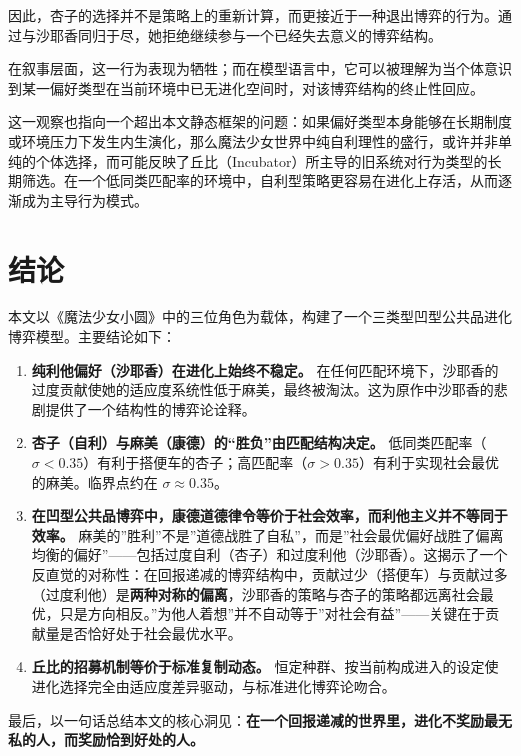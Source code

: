 \documentclass[12pt]{article}
\begin{document}
因此，杏子的选择并不是策略上的重新计算，而更接近于一种退出博弈的行为。通过与沙耶香同归于尽，她拒绝继续参与一个已经失去意义的博弈结构。

在叙事层面，这一行为表现为牺牲；而在模型语言中，它可以被理解为当个体意识到某一偏好类型在当前环境中已无进化空间时，对该博弈结构的终止性回应。

这一观察也指向一个超出本文静态框架的问题：如果偏好类型本身能够在长期制度或环境压力下发生内生演化，那么魔法少女世界中纯自利理性的盛行，或许并非单纯的个体选择，而可能反映了丘比（Incubator）所主导的旧系统对行为类型的长期筛选。在一个低同类匹配率的环境中，自利型策略更容易在进化上存活，从而逐渐成为主导行为模式。

\section{结论}

本文以《魔法少女小圆》中的三位角色为载体，构建了一个三类型凹型公共品进化博弈模型。主要结论如下：

\begin{enumerate}
    \item \textbf{纯利他偏好（沙耶香）在进化上始终不稳定。} 在任何匹配环境下，沙耶香的过度贡献使她的适应度系统性低于麻美，最终被淘汰。这为原作中沙耶香的悲剧提供了一个结构性的博弈论诠释。

    \item \textbf{杏子（自利）与麻美（康德）的“胜负”由匹配结构决定。} 低同类匹配率（$\sigma < 0.35$）有利于搭便车的杏子；高匹配率（$\sigma > 0.35$）有利于实现社会最优的麻美。临界点约在 $\sigma \approx 0.35$。

    \item \textbf{在凹型公共品博弈中，康德道德律令等价于社会效率，而利他主义并不等同于效率。} 麻美的”胜利”不是”道德战胜了自私”，而是”社会最优偏好战胜了偏离均衡的偏好”——包括过度自利（杏子）和过度利他（沙耶香）。这揭示了一个反直觉的对称性：在回报递减的博弈结构中，贡献过少（搭便车）与贡献过多（过度利他）是\textbf{两种对称的偏离}，沙耶香的策略与杏子的策略都远离社会最优，只是方向相反。”为他人着想”并不自动等于”对社会有益”——关键在于贡献量是否恰好处于社会最优水平。

    \item \textbf{丘比的招募机制等价于标准复制动态。} 恒定种群、按当前构成进入的设定使进化选择完全由适应度差异驱动，与标准进化博弈论吻合。
\end{enumerate}

最后，以一句话总结本文的核心洞见：\textbf{在一个回报递减的世界里，进化不奖励最无私的人，而奖励恰到好处的人。}



 
\end{document}
